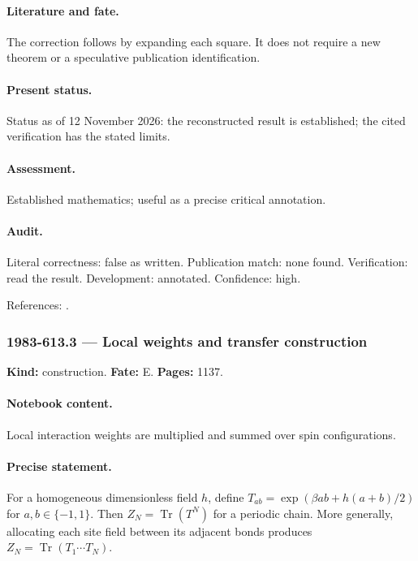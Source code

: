 \paragraph{Literature and fate.} The correction follows by expanding each square. It does not require a new theorem or a speculative publication identification.

\paragraph{Present status.} Status as of 12 November 2026: the reconstructed result is established; the cited verification has the stated limits.

\paragraph{Assessment.} Established mathematics; useful as a precise critical annotation.

\paragraph{Audit.} Literal correctness: false as written. Publication match: none found. Verification: read the result. Development: annotated. Confidence: high.

\noindent References: \citep{ising1925ferromagnetismus}.\par

\subsubsection{1983-613.3 --- Local weights and transfer construction}

\label{item:1983-613.3}

\noindent\textbf{Kind:} construction. \textbf{Fate:} E. \textbf{Pages:} 1137.\par

\paragraph{Notebook content.} Local interaction weights are multiplied and summed over spin configurations.

\paragraph{Precise statement.} For a homogeneous dimensionless field $h$, define $T_{ab}=\exp(\beta ab+h(a+b)/2)$ for $a,b\in\{-1,1\}$. Then $Z_N=\operatorname{Tr}(T^N)$ for a periodic chain. More generally, allocating each site field between its adjacent bonds produces $Z_N=\operatorname{Tr}(T_1\cdots T_N)$.

